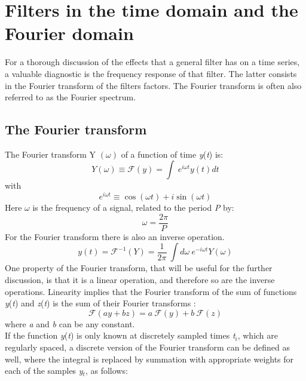 \documentclass[english,blauw]{cbsdiscussionpaper}
\begin{document}
\section{Filters in the time domain and the Fourier domain}
For a thorough discussion of the effects that a general filter has on a time series, a valuable diagnostic is the frequency response of that filter. The latter consists in the Fourier transform of the filters factors. The Fourier transform is often also referred to as the Fourier spectrum.\\ 
\subsection{The Fourier transform}
The Fourier transform Y $(\omega)$ of a function of time \textit{y}(\textit{t}) is:
\begin{equation}
Y (\omega)\equiv \mathcal{F} (\textit{y})= \int \ e^{i \omega t} y(\textit{t}) dt
\end{equation}
with
\begin{equation*}
e^{i \omega t} \equiv \cos(\omega t) + i \sin(\omega t)
\end{equation*}
Here $\omega$ is the frequency of a signal, related to the period \textit{P} by:
\begin{equation}
\omega = \frac {2\pi}{P}
\end{equation}
For the Fourier transform there is also an inverse operation.
\begin{equation}
y(\textit{t}) = \mathcal{F}^{-1} (Y) = \frac {1}{2 \pi} \ \int d\omega \ e^{-i \omega t} Y(\omega)
\end{equation}
One property of the Fourier transform, that will be useful for the further discussion, is that it is a linear operation, and therefore so are the inverse operations. Linearity implies that the Fourier transform of the sum of functions \textit{y}(\textit{t}) and \textit{z}(\textit{t}) is the sum of their Fourier transforms \citep{bracewell1965}:
\begin{equation}
\mathcal{F}(\textit{a} y + \textit{b} z) = \textit{a} \ \mathcal{F}(y)+ \textit{b} \ \mathcal{F}(z)
\end{equation}
where \textit{a} and \textit{b} can be any constant.\\
If the function \textit{y}(\textit{t}) is only known at discretely sampled times \textit{t$_i$}, which are regularly spaced, a discrete version of the Fourier transform can be defined as well, where the integral is replaced by summation with appropriate weights for each of the samples \textit{y$_t$}, as follows:
\end{document}
